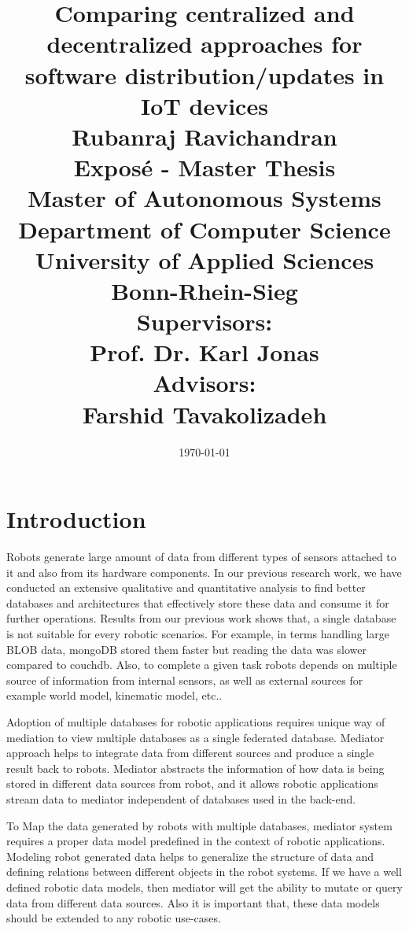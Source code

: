 \documentclass[12pt]{article}
\begin{document}
\title{\Large Comparing centralized and decentralized approaches for software distribution/updates in IoT devices\\
[6mm]
\Large Rubanraj Ravichandran\\
[12mm]
\Large Expos{\'e} - Master Thesis\\
\small Master of Autonomous Systems\\
[12mm]
\Large Department of Computer Science\\
University of Applied Sciences Bonn-Rhein-Sieg\\
[12mm]
\Large Supervisors:\\
Prof. Dr. Karl Jonas\\
\Large Advisors:\\
Farshid Tavakolizadeh
}
\date{\today}
\maketitle
\newpage
\section{Introduction}

Robots generate large amount of data from different types of sensors attached to it and also from its hardware components. In our previous research work, we have conducted an extensive qualitative and quantitative analysis to find better databases and architectures that effectively store these data and consume it for further operations. Results from our previous work shows that, a single database is not suitable for every robotic scenarios. For example, in terms handling large BLOB data, mongoDB stored them faster but reading the data was slower compared to couchdb. Also, to complete a given task robots depends on multiple source of information from internal sensors, as well as external sources for example world model, kinematic model, etc.. 

Adoption of multiple databases for robotic applications requires unique way of mediation to view multiple databases as a single federated database. Mediator approach helps to integrate data from different sources and produce a single result back to robots. Mediator abstracts the information of how data is being stored in different data sources from robot, and it allows robotic applications stream data to mediator independent of databases used in the back-end.

To Map the data generated by robots with multiple databases, mediator system requires a proper data model predefined in the context of robotic applications. Modeling robot generated data helps to generalize the structure of data and defining relations between different objects in the robot systems. If we have a well defined robotic data models, then mediator will get the ability to mutate or query data from different data sources. Also it is important that, these data models should be extended to any robotic use-cases.
\end{document}
